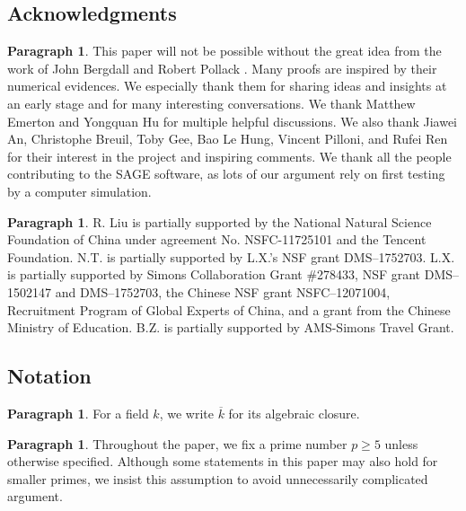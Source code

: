 \documentclass[12pt]{amsart}
\theoremstyle{definition}
\newtheorem{para}[subsection]{Paragraph}
\numberwithin{equation}{subsection}
\def\CC{\mathbb{C}}
\def\NN{\mathbb{N}}
\begin{document}
\subsection*{Acknowledgments}
\begin{para}
\label{P:para_028}
This paper will not be possible without the great idea from the work of John Bergdall and Robert Pollack \cite{bergdall-pollack2,bergdall-pollack3}.
Many proofs are inspired by their numerical evidences.  We especially thank them for sharing ideas and insights at an early stage and for many interesting conversations.
We thank Matthew Emerton and Yongquan Hu for multiple helpful discussions. We also thank Jiawei An, Christophe Breuil, Toby Gee, Bao Le Hung, Vincent Pilloni, and Rufei Ren for their interest in the project and inspiring comments.
We thank all the people contributing to the SAGE software, as lots of our argument rely on first testing by a computer simulation.
\end{para}

\begin{para}
\label{P:para_029}
R. Liu is partially supported by the National Natural Science Foundation of China under agreement No. NSFC-11725101 and the Tencent Foundation. N.T. is partially supported by L.X.'s NSF grant DMS--1752703.
L.X. is  partially supported by Simons Collaboration Grant \#278433, NSF grant DMS--1502147 and DMS--1752703, the Chinese NSF grant NSFC--12071004, Recruitment Program of Global Experts of China, and a grant
from the Chinese Ministry of Education. B.Z. is partially supported by
AMS-Simons Travel Grant.
\end{para}

\subsection*{Notation}
\label{S:notation}
\begin{para}
\label{P:para_030}
For a field $k$, we write $\overline k$ for its algebraic closure.
\end{para}


\begin{para}
\label{P:para_031}
Throughout the paper, we fix a prime number $p\geq 5$ unless otherwise specified. Although some statements in this paper may also hold for smaller primes, we insist this assumption to avoid unnecessarily complicated argument.
\end{para}
\end{document}
